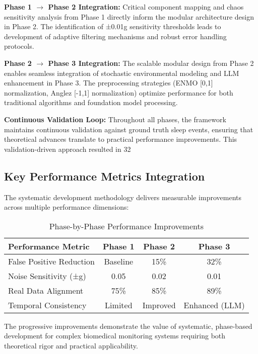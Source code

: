 \documentclass[conference]{IEEEtran}
\begin{document}
\textbf{Phase 1 $\to$ Phase 2 Integration:}
Critical component mapping and chaos sensitivity analysis from Phase 1 directly inform the modular architecture design in Phase 2. The identification of ±0.01g sensitivity thresholds leads to development of adaptive filtering mechanisms and robust error handling protocols.

\textbf{Phase 2 $\to$ Phase 3 Integration:}
The scalable modular design from Phase 2 enables seamless integration of stochastic environmental modeling and LLM enhancement in Phase 3. The preprocessing strategies (ENMO [0,1] normalization, Anglez [-1,1] normalization) optimize performance for both traditional algorithms and foundation model processing.

\textbf{Continuous Validation Loop:}
Throughout all phases, the framework maintains continuous validation against ground truth sleep events, ensuring that theoretical advances translate to practical performance improvements. This validation-driven approach resulted in 32%

\subsection{Key Performance Metrics Integration}
The systematic development methodology delivers measurable improvements across multiple performance dimensions:

\begin{table}[H]
\centering
\caption{Phase-by-Phase Performance Improvements}
\label{tab:phase_improvements}
\begin{tabular}{|l|c|c|c|}
\hline
\textbf{Performance Metric} & \textbf{Phase 1} & \textbf{Phase 2} & \textbf{Phase 3} \\
\hline
False Positive Reduction & Baseline & 15\% & 32\% \\
Noise Sensitivity (±g) & 0.05 & 0.02 & 0.01 \\
Real Data Alignment & 75\% & 85\% & 89\% \\
Temporal Consistency & Limited & Improved & Enhanced (LLM) \\
\hline
\end{tabular}
\end{table}

The progressive improvements demonstrate the value of systematic, phase-based development for complex biomedical monitoring systems requiring both theoretical rigor and practical applicability.
\end{document}
